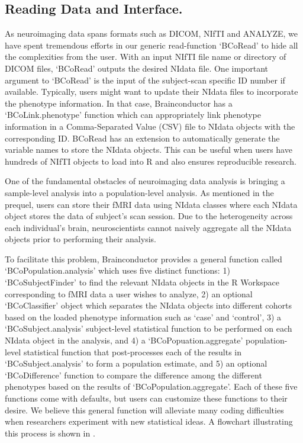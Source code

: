 \documentclass{nature}
\begin{document}
\subsection{Reading Data and Interface.}
As neuroimaging data spans formats such as DICOM, NIfTI and ANALYZE, we have
spent tremendous efforts in our generic read-function `BCoRead' to hide
all the complexities from the user. With an input NIfTI file name or directory of
DICOM files, `BCoRead' outputs the desired NIdata
file.
One important argument to `BCoRead' is the input of the subject-scan specific ID
number if available. 
Typically, users might want to update their NIdata files to incorporate the
phenotype information. In that case, Brainconductor has a `BCoLink.phenotype'
function
which can appropriately link phenotype information in a Comma-Separated Value
(CSV) file to NIdata objects with the corresponding ID. 
BCoRead has an extension to automatically generate the variable names to store
the NIdata objects. This can be useful when users have hundreds of NIfTI
objects to load into R and also ensures reproducible research.

One of the fundamental obstacles of neuroimaging data analysis is bringing a
sample-level
analysis into a population-level analysis. As mentioned in the prequel, users
can
store their fMRI data using NIdata classes where each NIdata object stores the
data of
subject's scan session. Due to the heterogeneity across each individual's brain,
neuroscientists cannot naively aggregate all the NIdata objects prior to
performing their
analysis.

To facilitate this problem, Brainconductor provides a general function
called `BCoPopulation.analysis' which uses five distinct functions: 1) `BCoSubjectFinder' to
find the relevant NIdata objects in the R Workspace corresponding to fMRI data a
user wishes to analyze,
2) an optional `BCoClassifier' object which separates the NIdata objects into
different cohorts based on the loaded phenotype information such as `case' and
`control', 3)
a `BCoSubject.analysis' subject-level statistical function to be
performed on each NIdata object in the
analysis, and 4) a `BCoPopuation.aggregate' population-level
statistical function
that post-processes each of the results in `BCoSubject.analysis' to form a
population
estimate, and 5) an optional `BCoDifference'
function
to compare the difference among the different phenotypes based on the
results of `BCoPopulation.aggregate'. Each of these five functions come with
defaults, but users can customize these functions to their desire. We believe this general
function will alleviate many coding difficulties when researchers experiment
with
new statistical ideas. A flowchart illustrating this process is shown in
.
\end{document}
